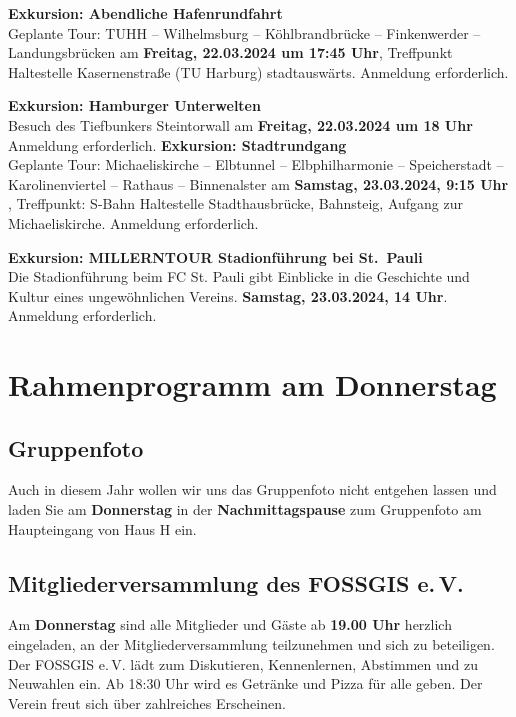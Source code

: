 \noindent
{\large \bfseries Exkursion: Abendliche Hafenrundfahrt}\\
Geplante Tour: TUHH – Wilhelmsburg – Köhlbrandbrücke – Finkenwerder – Landungsbrücken am {\bfseries Freitag, 22.03.2024 um 17:45 Uhr}, Treffpunkt Haltestelle Kasernenstraße (TU Harburg) stadtauswärts. Anmeldung erforderlich.
\bigskip

\noindent
{\large \bfseries Exkursion: Hamburger Unterwelten}\\
Besuch des Tiefbunkers Steintorwall am {\bfseries Freitag, 22.03.2024 um 18 Uhr }
Anmeldung erforderlich.
\bigskip
\newpage
\noindent
{\large \bfseries Exkursion: Stadtrundgang}\\
Geplante Tour: Michaeliskirche – Elbtunnel – Elbphilharmonie – Speicherstadt – Karolinenviertel – Rathaus – Binnenalster am {\bfseries Samstag, 23.03.2024, 9:15 Uhr }, Treffpunkt: S-Bahn Haltestelle Stadthausbrücke, Bahnsteig, Aufgang zur Michaeliskirche. Anmeldung erforderlich.
\bigskip

\noindent
{\large \bfseries Exkursion: MILLERNTOUR Stadionführung bei St.~Pauli}\\
Die Stadionführung beim FC St. Pauli gibt Einblicke in die Geschichte und Kultur eines ungewöhnlichen Vereins. {\bfseries Samstag, 23.03.2024, 14 Uhr}. Anmeldung erforderlich.

\section*{Rahmenprogramm am Donnerstag}
\subsection*{Gruppenfoto}
Auch in diesem Jahr wollen wir uns das Gruppenfoto nicht entgehen lassen und laden Sie am {\bfseries Donnerstag} in der {\bfseries Nachmittagspause} zum Gruppenfoto am Haupteingang von Haus H ein.

\subsection*{Mitgliederversammlung des FOSSGIS e.\,V.}
Am {\bfseries Donnerstag} sind alle Mitglieder und Gäste ab {\bfseries 19.00 Uhr} herzlich eingeladen, an der Mitgliederversammlung teilzunehmen und sich zu beteiligen. Der FOSSGIS e.\,V. lädt zum Diskutieren, Kennenlernen, Abstimmen und zu Neuwahlen ein. Ab 18:30 Uhr wird es Getränke und Pizza für alle geben. Der Verein freut sich über zahlreiches Erscheinen.

